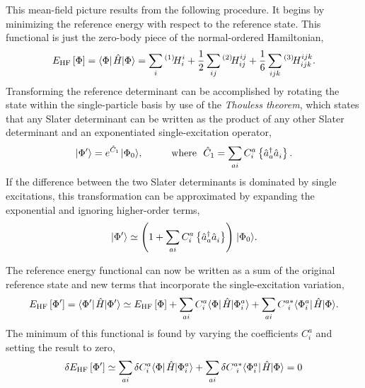 \documentclass[thesis.tex]{subfiles}
\begin{document}
This mean-field picture results from the following procedure.  It begins by minimizing the reference energy with respect to the reference state.  This functional is just the zero-body piece of the normal-ordered Hamiltonian,
\begin{equation}
  E_{\text{HF}}\left[ \Phi \right] = \element{\Phi}{\Ham}{\Phi} = \sum_{\mathclap{i}}\Hint{1}{i}{i} + \frac{1}{2}\sum_{\mathclap{ij}}\Hint{2}{ij}{ij} + \frac{1}{6}\sum_{\mathclap{ijk}}\Hint{3}{ijk}{ijk}.
\end{equation}
Transforming the reference determinant can be accomplished by rotating the state within the single-particle basis by use of the \textit{Thouless theorem}, which states that any Slater determinant can be written as the product of any other Slater determinant and an exponentiated single-excitation operator,
\begin{equation} \label{eq:thouless}
  \ket{\Phi'} = e^{\hat{C}_{1}}\ket{\Phi_{0}}, \hspace{1cm} \text{where\ \ } \hat{C}_{1} = \sum_{a i}C^{a}_{i}\normord{ \co{a}\ao{i} }.
\end{equation}
If the difference between the two Slater determinants is dominated by single excitations, this transformation can be approximated by expanding the exponential and ignoring higher-order terms,
\begin{equation} \label{eq:thouless_limit}
  \hspace{1pt}\lvert \Phi' \rangle \simeq \left( 1 + \sum_{a i}C^{a}_{i}\left\{ \hat{a}_{a}^{\dagger}\hat{a}_{i}^{} \right\} \right)\hspace{1pt}\lvert \Phi_{0} \rangle.
\end{equation}

The reference energy functional can now be written as a sum of the original reference state and new terms that incorporate the single-excitation variation,
\begin{equation} \label{eq:hf_thouless}
  E_{\text{HF}}\left[ \Phi' \right] = \element{\Phi'}{\Ham}{\Phi'} \simeq E_{\text{HF}}\left[ \Phi \right] + \sum_{a i}C^{a}_{i}\refbra\Ham\ket{\Phi^{a}_{i}} + \sum_{a i}C^{a*}_{\ i}\bra{\Phi^{a}_{i}}\Ham\refket.
\end{equation}
The minimum of this functional is found by varying the coefficients $C^{a}_{i}$ and setting the result to zero,
\begin{equation} \label{eq:del_hf_thouless}
  \delta E_{\text{HF}}\left[ \Phi' \right] \simeq \sum_{a i}\delta C^{a}_{i}\refbra\Ham\ket{\Phi^{a}_{i}} + \sum_{a i}\delta C^{a*}_{\ i}\bra{\Phi^{a}_{i}}\Ham\refket = 0
\end{equation}
\end{document}
